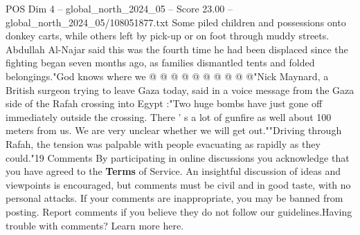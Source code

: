 \begin{textsample}{POS Dim 4 – global\_north\_2024\_05 – Score 23.00 – global\_north\_2024\_05/108051877.txt}
Some piled children and possessions onto donkey carts, while others left by pick-up or on foot through muddy streets.
Abdullah Al-Najar said this was the fourth time he had been displaced since the fighting began seven months ago, as families dismantled tents and folded belongings."God knows where we @ @ @ @ @ @ @ @ @ @"Nick Maynard, a British surgeon trying to leave Gaza today, said in a voice message from the Gaza side of the Rafah crossing into Egypt :"Two huge bombs have just gone off immediately outside the crossing.
There ' s a lot of gunfire as well about 100 meters from us.
We are very unclear whether we will get out.""Driving through Rafah, the tension was palpable with people evacuating as rapidly as they could."19 Comments By participating in online discussions you acknowledge that you have agreed to the \textbf{Terms} of Service.
An insightful discussion of ideas and viewpoints is encouraged, but comments must be civil and in good taste, with no personal attacks.
If your comments are inappropriate, you may be banned from posting.
Report comments if you believe they do not follow our guidelines.Having trouble with comments?
Learn more here.

\end{textsample}
